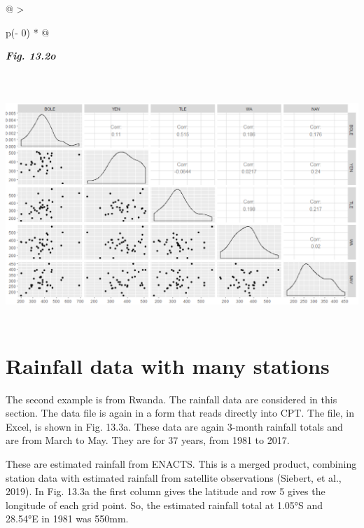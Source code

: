 \documentclass[
  letterpaper,
  DIV=11,
  numbers=noendperiod]{scrreprt}
\begin{document}
\begin{longtable}[]{@{}
  >{\raggedright\arraybackslash}p{(\columnwidth - 0\tabcolsep) * }@{}}
\toprule\noalign{}
\begin{minipage}[b]{\linewidth}\raggedright
\textbf{\emph{Fig. 13.2o}}
\end{minipage} \\
\midrule\noalign{}
\endhead
\bottomrule\noalign{}
\endlastfoot
\includegraphics[width=6.11252in,height=3.49577in]{figures/Fig13.2o.png} \\
\end{longtable}

\section{Rainfall data with many
stations}\label{rainfall-data-with-many-stations}

The second example is from Rwanda. The rainfall data are considered in
this section. The data file is again in a form that reads directly into
CPT. The file, in Excel, is shown in Fig. 13.3a. These data are again
3-month rainfall totals and are from March to May. They are for 37
years, from 1981 to 2017.

These are estimated rainfall from ENACTS. This is a merged product,
combining station data with estimated rainfall from satellite
observations (Siebert, et al., 2019). In Fig. 13.3a the first column
gives the latitude and row 5 gives the longitude of each grid point. So,
the estimated rainfall total at 1.05°S and 28.54°E in 1981 was 550mm.
\end{document}
